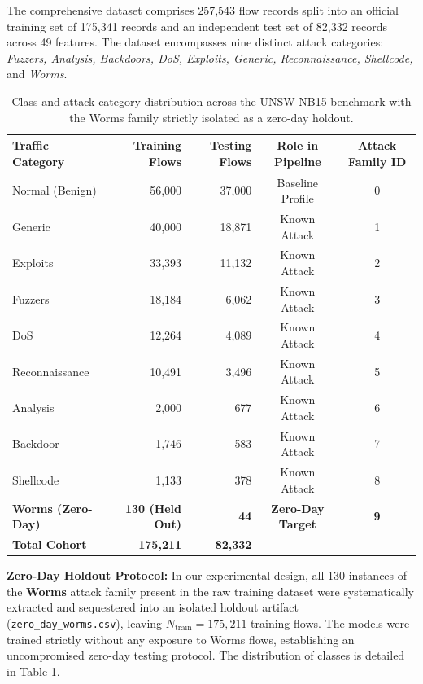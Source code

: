 \documentclass[preprint,12pt]{elsarticle}
\begin{document}
The comprehensive dataset comprises 257,543 flow records split into an official training set of 175,341 records and an independent test set of 82,332 records across 49 features. The dataset encompasses nine distinct attack categories: \textit{Fuzzers, Analysis, Backdoors, DoS, Exploits, Generic, Reconnaissance, Shellcode,} and \textit{Worms}.

\begin{table}[t]
\centering
\caption{Class and attack category distribution across the UNSW-NB15 benchmark with the Worms family strictly isolated as a zero-day holdout.}
\label{tab:dataset_distribution}
\small
\begin{tabular}{lrrcc}
\toprule
\textbf{Traffic Category} & \textbf{Training Flows} & \textbf{Testing Flows} & \textbf{Role in Pipeline} & \textbf{Attack Family ID} \\
\midrule
Normal (Benign)        & 56,000  & 37,000 & Baseline Profile & 0 \\
Generic                & 40,000  & 18,871 & Known Attack     & 1 \\
Exploits               & 33,393  & 11,132 & Known Attack     & 2 \\
Fuzzers                & 18,184  & 6,062  & Known Attack     & 3 \\
DoS                    & 12,264  & 4,089  & Known Attack     & 4 \\
Reconnaissance         & 10,491  & 3,496  & Known Attack     & 5 \\
Analysis               & 2,000   & 677    & Known Attack     & 6 \\
Backdoor               & 1,746   & 583    & Known Attack     & 7 \\
Shellcode              & 1,133   & 378    & Known Attack     & 8 \\
\midrule
\textbf{Worms (Zero-Day)} & \textbf{130 (Held Out)} & \textbf{44} & \textbf{Zero-Day Target} & \textbf{9} \\
\midrule
\textbf{Total Cohort}  & \textbf{175,211} & \textbf{82,332} & -- & -- \\
\bottomrule
\end{tabular}
\end{table}

\textbf{Zero-Day Holdout Protocol:} In our experimental design, all 130 instances of the \textbf{Worms} attack family present in the raw training dataset were systematically extracted and sequestered into an isolated holdout artifact (\texttt{zero\_day\_worms.csv}), leaving $N_{\text{train}} = 175,211$ training flows. The models were trained strictly without any exposure to Worms flows, establishing an uncompromised zero-day testing protocol. The distribution of classes is detailed in Table \ref{tab:dataset_distribution}.
\end{document}
